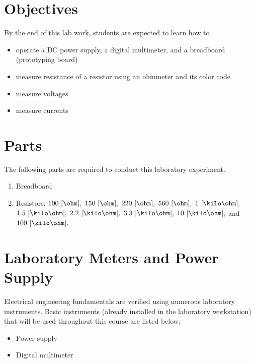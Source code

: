 \section{Objectives}
By the end of this lab work, students are expected to learn how to 

\begin{itemize}
    \item operate a DC power supply, a digital multimeter, and a breadboard (prototyping board) 
    \item measure resistance of a resistor using an ohmmeter and its color code
    \item measure voltages      
    \item measure currents
      
\end{itemize}

\section{Parts}
\label{sec:partsEx1}
The following parts are required to conduct this laboratory experiment. %
%
\begin{enumerate}           
\item Breadboard
\item Resistors: $100~[\ohm],$ $150~[\ohm],$ $220~[\ohm],$ $560~[\ohm],$  $1~[\kilo\ohm],$ $1.5~[\kilo\ohm],$ $2.2~[\kilo\ohm],$ $3.3~[\kilo\ohm],$ $10~[\kilo\ohm],$ and  $100~[\kilo\ohm].$
\end{enumerate}
  
\section{Laboratory Meters and Power Supply}
\label{sec:laboratoryMeters}

Electrical engineering fundamentals are verified using numerous laboratory instruments. Basic instruments (already installed in the laboratory workstation) that will be used throughout this course are listed below:
%
\begin{itemize}
\item Power supply
 
\item Digital multimeter
  
  
\end{itemize}

